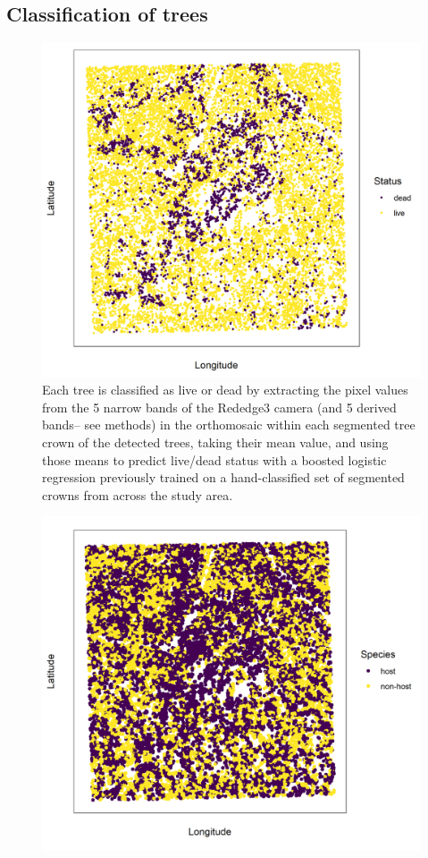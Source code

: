 \documentclass[twoside,12pt,final]{ucthesis-CA2012}
\begin{document}
\begin{ucmainmatter}
\subsection{Classification of trees}\label{classification-of-trees}
\begin{figure}
\centering
\includegraphics[width=6.00000in]{figure/chap02/eldo_3k_3_live_dead.png}
\caption{Each tree is classified as live or dead by extracting the pixel
values from the 5 narrow bands of the Rededge3 camera (and 5 derived
bands-- see methods) in the orthomosaic within each segmented tree crown
of the detected trees, taking their mean value, and using those means to
predict live/dead status with a boosted logistic regression previously
trained on a hand-classified set of segmented crowns from across the
study area.}
\end{figure}
\begin{figure}
\centering
\includegraphics[width=6.00000in]{figure/chap02/eldo_3k_3_host_nonhost.png}

\end{figure}
\end{ucmainmatter}
\end{document}
